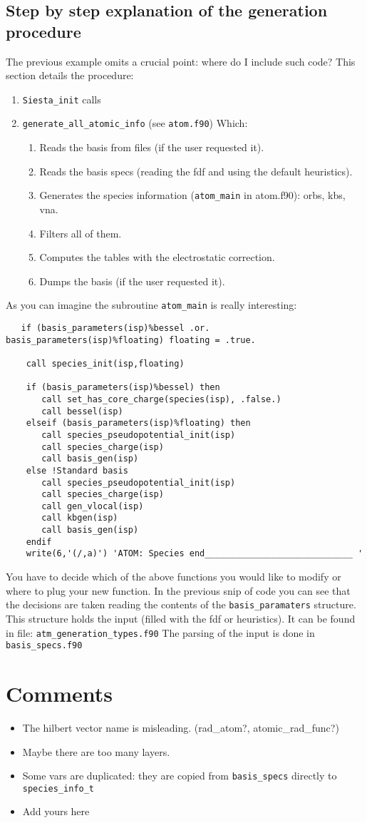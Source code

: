 \documentclass[12pt]{article}
\begin{document}
\subsection{Step by step explanation of the generation procedure}

The previous example omits a crucial point: where do I include such
code?
This section details the procedure:

\begin{enumerate}
\item \verb!Siesta_init! calls
\item \verb!generate_all_atomic_info! (see \verb!atom.f90!)
Which:
     \begin{enumerate}
     \item Reads the basis from files (if the user requested it).
     \item Reads the basis specs (reading the fdf and using the default heuristics).
     \item Generates the species information (\verb!atom_main! in atom.f90): orbs, kbs, vna.
     \item Filters all of them.
     \item Computes the tables with the electrostatic correction. 
     \item Dumps the basis (if the user requested it).
     \end{enumerate}
\end{enumerate}

As you can imagine the subroutine \verb!atom_main!  is really interesting:

\begin{verbatim}
   if (basis_parameters(isp)%bessel .or. basis_parameters(isp)%floating) floating = .true.
   
    call species_init(isp,floating)
   
    if (basis_parameters(isp)%bessel) then
       call set_has_core_charge(species(isp), .false.)
       call bessel(isp)
    elseif (basis_parameters(isp)%floating) then
       call species_pseudopotential_init(isp)
       call species_charge(isp)
       call basis_gen(isp)
    else !Standard basis
       call species_pseudopotential_init(isp)
       call species_charge(isp)       
       call gen_vlocal(isp)
       call kbgen(isp)
       call basis_gen(isp)
    endif
    write(6,'(/,a)') 'ATOM: Species end_____________________________ '
\end{verbatim}

You have to decide which of the above functions you would like to modify or where to plug your new function.
In the previous snip of code you can see that the decisions are taken reading the contents
of the \verb!basis_paramaters! structure. This structure holds the input (filled with the fdf or heuristics). It can be found in file:  \verb!atm_generation_types.f90! The parsing of the input is done in \verb!basis_specs.f90!

\section{Comments}
\begin{itemize}
\item The hilbert vector name is misleading. (rad_atom?, atomic_rad_func?)
\item Maybe there are too many layers.
\item Some vars are duplicated: they are copied from \verb!basis_specs! directly to \verb!species_info_t! 
\item Add yours here
\end{itemize}
\end{document}
